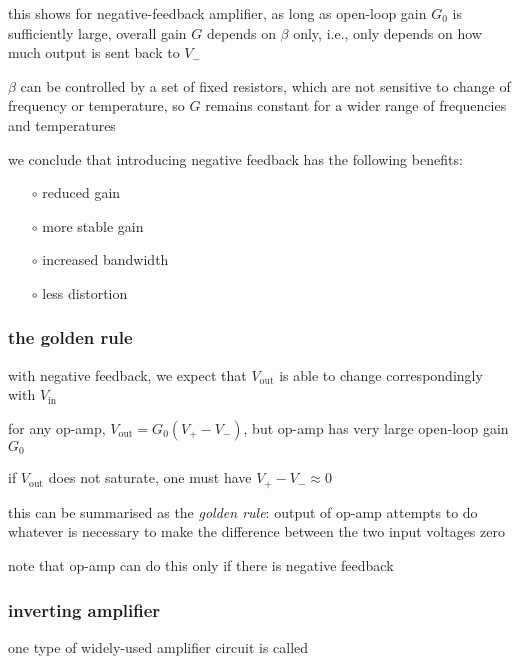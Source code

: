 this shows for negative-feedback amplifier, as long as open-loop gain $G_0$ is sufficiently large, overall gain $G$ depends on $\beta$ only, i.e., only depends on how much output is sent back to $V_-$


$\beta$ can be controlled by a set of fixed resistors, which are not sensitive to change of frequency or temperature, so $G$ remains constant for a wider range of frequencies and temperatures




\newpage

we conclude that introducing negative feedback has the following benefits:

\begin{itemize}[leftmargin=\parindent]
	\item[$\circ$] reduced gain
	
	\item[$\circ$] more stable gain
	
	\item[$\circ$] increased bandwidth
	
	\item[$\circ$] less distortion
\end{itemize}


\subsubsection*{the golden rule}

with negative feedback, we expect that $V_\text{out}$ is able to change correspondingly with $V_\text{in}$

for any op-amp, $V_\text{out} = G_0(V_+-V_-)$, but op-amp has very large open-loop gain $G_0$

if $V_\text{out}$ does not saturate, one must have $V_+ - V_- \approx 0$

this can be summarised as the \emph{golden rule}: output of op-amp attempts to do whatever is necessary to make the difference between the two input voltages zero

note that op-amp can do this only if there is negative feedback

\subsubsection{inverting amplifier}

one type of widely-used amplifier circuit is called 

